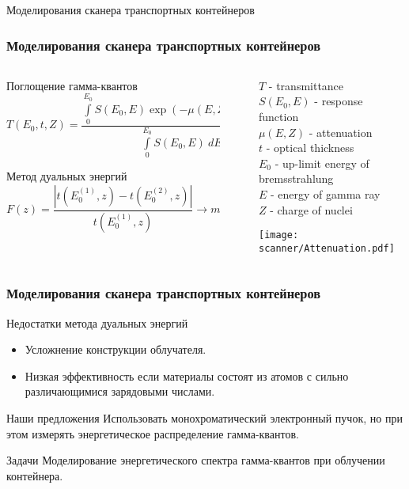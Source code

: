 \begin{frame}
\begin{center}
	\Huge
	Моделирования сканера транспортных контейнеров
\end{center}
\end{frame}

\begin{frame}
\frametitle{Моделирования сканера транспортных контейнеров}
\begin{columns}
	\begin{column}{0.7\textwidth}
		\begin{block}{Поглощение гамма-квантов}
		$$
		T(E_0, t, Z) = \frac{\int \limits_0^{E_0} S(E_0, E) \exp(-\mu(E,Z)\times t)~dE)}{\int \limits_0^{E_0} S(E_0, E)~dE}
		$$
	\end{block}
    \begin{block}{Метод дуальных энергий}
    	$$
    	F(z) = \frac{|t(E^{(1)}_0,z) - t(E^{(2)}_0,z)|}{t(E^{(1)}_0,z)} \to min
    	$$
\end{block}
	\end{column}
	\vline~
	\begin{column}{0.4\textwidth} 
		$T$ -  transmittance\\
		$S(E_0, E)$ - response function\\
		$\mu(E,Z)$ - attenuation\\
		$t$ -  optical thickness\\
		$E_0$ -  up-limit energy of bremsstrahlung\\
		$E$ - energy of gamma ray\\
		$Z$ - charge of nuclei 
        
        \texttt{[image: scanner/Attenuation.pdf]}
	\end{column}
\end{columns}  
\end{frame}

\begin{frame}
\frametitle{Моделирования сканера транспортных контейнеров}
\begin{block}{Недостатки метода дуальных энергий}%
	\begin{itemize}
		\item Усложнение конструкции облучателя.
		\item Низкая эффективность если материалы состоят из атомов с сильно различающимися зарядовыми числами.
	\end{itemize}
\end{block}
\begin{block}{Наши предложения}%
	Использовать монохроматический электронный пучок, но при этом измерять энергетическое распределение гамма-квантов.
\end{block}
\begin{block}{Задачи}%
	Моделирование энергетического спектра гамма-квантов при облучении контейнера.
\end{block}
\end{frame}

